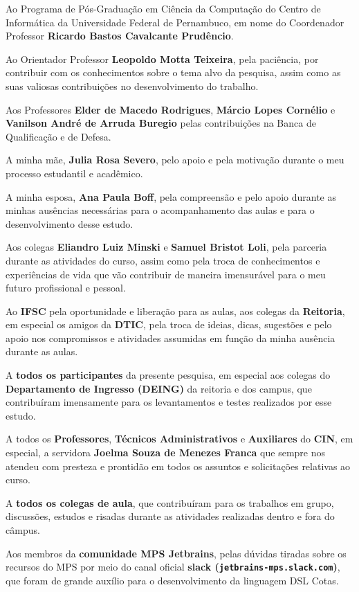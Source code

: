 \begin{agradecimentos}
Ao Programa de Pós-Graduação em Ciência da Computação do Centro de Informática da Universidade Federal de Pernambuco, em nome do Coordenador Professor \textbf{Ricardo Bastos Cavalcante Prudêncio}.

Ao Orientador Professor \textbf{Leopoldo Motta Teixeira}, pela paciência, por contribuir com os conhecimentos sobre o tema alvo da pesquisa, assim como as suas valiosas contribuições no desenvolvimento do trabalho.

Aos Professores \textbf{Elder de Macedo Rodrigues}, \textbf{Márcio Lopes Cornélio} e \textbf{Vanilson André de Arruda Buregio} pelas contribuições na Banca de Qualificação e de Defesa.

A minha mãe, \textbf{Julia Rosa Severo}, pelo apoio e pela motivação durante o meu processo estudantil e acadêmico.

A minha esposa, \textbf{Ana Paula Boff}, pela compreensão e pelo apoio durante as minhas ausências necessárias para o acompanhamento das aulas e para o desenvolvimento desse estudo.

Aos colegas \textbf{Eliandro Luiz Minski} e \textbf{Samuel Bristot Loli}, pela parceria durante as atividades do curso, assim como pela troca de conhecimentos e experiências de vida que vão contribuir de maneira imensurável para o meu futuro profissional e pessoal.

Ao \textbf{IFSC} pela oportunidade e liberação para as aulas, aos colegas da \textbf{Reitoria}, em especial os amigos da \textbf{DTIC}, pela troca de ideias, dicas, sugestões e pelo apoio nos compromissos e atividades assumidas em função da minha ausência durante as aulas.

A \textbf{todos os participantes} da presente pesquisa, em especial aos colegas do \textbf{Departamento de Ingresso (DEING)} da reitoria e dos campus, que contribuíram imensamente para os levantamentos e testes realizados por esse estudo.

A todos os \textbf{Professores}, \textbf{Técnicos Administrativos} e \textbf{Auxiliares} do \textbf{CIN}, em especial, a servidora \textbf{Joelma Souza de Menezes Franca} que sempre nos atendeu com presteza e prontidão em todos os assuntos e solicitações relativas ao curso.

A \textbf{todos os colegas de aula}, que contribuíram para os trabalhos em grupo, discussões, estudos e risadas durante as atividades realizadas dentro e fora do câmpus. 

Aos membros da \textbf{comunidade MPS Jetbrains}, pelas dúvidas tiradas sobre os recursos do MPS por meio do canal oficial \textbf{slack (\texttt{jetbrains-mps.slack.com})}, que foram de grande auxílio para o desenvolvimento da linguagem DSL Cotas.



\end{agradecimentos}